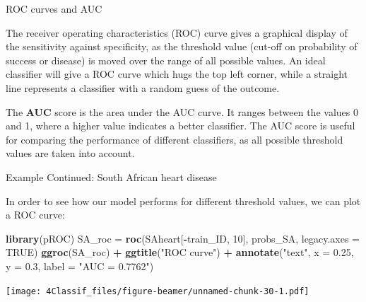 \documentclass[10pt,ignorenonframetext,]{beamer}
\newenvironment{Shaded}{\begin{snugshade}}{\end{snugshade}}
\newcommand{\KeywordTok}[1]{\textcolor[rgb]{0.13,0.29,0.53}{\textbf{#1}}}
\newcommand{\DataTypeTok}[1]{\textcolor[rgb]{0.13,0.29,0.53}{#1}}
\newcommand{\DecValTok}[1]{\textcolor[rgb]{0.00,0.00,0.81}{#1}}
\newcommand{\FloatTok}[1]{\textcolor[rgb]{0.00,0.00,0.81}{#1}}
\newcommand{\StringTok}[1]{\textcolor[rgb]{0.31,0.60,0.02}{#1}}
\newcommand{\OtherTok}[1]{\textcolor[rgb]{0.56,0.35,0.01}{#1}}
\newcommand{\OperatorTok}[1]{\textcolor[rgb]{0.81,0.36,0.00}{\textbf{#1}}}
\newcommand{\NormalTok}[1]{#1}
\begin{document}
\begin{frame}

\begin{block}{ROC curves and AUC}

The receiver operating characteristics (ROC) curve gives a graphical
display of the sensitivity against specificity, as the threshold value
(cut-off on probability of success or disease) is moved over the range
of all possible values. An ideal classifier will give a ROC curve which
hugs the top left corner, while a straight line represents a classifier
with a random guess of the outcome.

The \textbf{AUC} score is the area under the AUC curve. It ranges
between the values 0 and 1, where a higher value indicates a better
classifier. The AUC score is useful for comparing the performance of
different classifiers, as all possible threshold values are taken into
account.

\end{block}

\end{frame}

\begin{frame}[fragile]

\begin{block}{Example Continued: South African heart disease}

In order to see how our model performs for different threshold values,
we can plot a ROC curve:

\begin{Shaded}
\begin{Highlighting}[]
\KeywordTok{library}\NormalTok{(pROC)}
\NormalTok{SA_roc =}\StringTok{ }\KeywordTok{roc}\NormalTok{(SAheart[}\OperatorTok{-}\NormalTok{train_ID, }\DecValTok{10}\NormalTok{], probs_SA, }\DataTypeTok{legacy.axes =} \OtherTok{TRUE}\NormalTok{)}
\KeywordTok{ggroc}\NormalTok{(SA_roc) }\OperatorTok{+}\StringTok{ }\KeywordTok{ggtitle}\NormalTok{(}\StringTok{"ROC curve"}\NormalTok{) }\OperatorTok{+}\StringTok{ }\KeywordTok{annotate}\NormalTok{(}\StringTok{"text"}\NormalTok{, }\DataTypeTok{x =} \FloatTok{0.25}\NormalTok{, }\DataTypeTok{y =} \FloatTok{0.3}\NormalTok{, }
    \DataTypeTok{label =} \StringTok{"AUC = 0.7762"}\NormalTok{)}
\end{Highlighting}
\end{Shaded}

\texttt{[image: 4Classif\_files/figure-beamer/unnamed-chunk-30-1.pdf]}

\end{block}

\end{frame}
\end{document}
